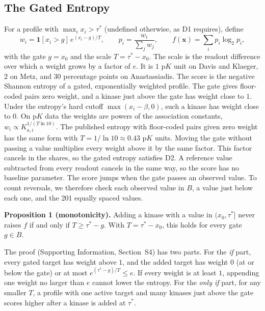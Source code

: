 \subsection{The Gated Entropy}
\label{sec:methods:gated}

For a profile with $\max_i x_i > \tau^*$
(undefined otherwise, as D1 requires), define
\begin{equation}
  w_i = \mathbf{1}[x_i > g]\, e^{(x_i - g)/T}, \qquad
  p_i = \frac{w_i}{\sum_j w_j}, \qquad
  f(\mathbf{x}) = \sum_i p_i \log_2 p_i,
  \label{eq:candidate}
\end{equation}
with the gate $g = x_0$ and the scale $T = \tau^* - x_0$. The scale is the
readout difference over which a weight grows by a factor of $e$. It is $1$
$\mathrm{p}K$ unit on Davis and Klaeger, $2$ on Metz, and $30$ percentage
points on Anastassiadis. The score is the negative Shannon entropy of a gated, exponentially
weighted profile. The gate gives floor-coded pairs zero weight, and a kinase
just above the gate has weight close to $1$. Under the entropy's hard cutoff
$\max(x_i - \beta, 0)$, such a kinase has weight close to $0$. On
$\mathrm{p}K$ data the weights are powers of the association constants,
$w_i \propto K_{a,i}^{1/(T \ln 10)}$. The published entropy with floor-coded
pairs given zero weight has the same form with $T = 1/\ln 10 \approx 0.43$
$\mathrm{p}K$ units. Moving the gate without passing a value multiplies every
weight above it by the same factor. This factor cancels in the shares, so the
gated entropy satisfies D2. A reference value subtracted from
every readout cancels in the same way, so the score has no baseline parameter.
The score jumps when the gate passes an observed value. To count reversals,
we therefore check each observed value in $B$, a value just below each one,
and the 201 equally spaced values.

\textbf{Proposition 1 (monotonicity).} Adding a kinase with a value in
$(x_0, \tau^*]$ never raises $f$ if and only if $T \geq \tau^* - g$. With
$T = \tau^* - x_0$, this holds for every gate $g \in B$.

The proof (Supporting Information, Section~S4) has two parts. For the
\emph{if} part, every gated target has weight above $1$, and the added target
has weight $0$ (at or below the gate) or at most $e^{(\tau^* - g)/T} \leq e$.
If every weight is at least $1$, appending one weight no larger than $e$
cannot lower the entropy. For the \emph{only if} part, for any smaller $T$, a
profile with one active target and many kinases just above the gate scores
higher after a kinase is added at $\tau^*$.

